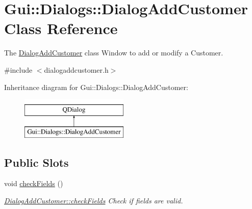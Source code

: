 \hypertarget{classGui_1_1Dialogs_1_1DialogAddCustomer}{\section{Gui\-:\-:Dialogs\-:\-:Dialog\-Add\-Customer Class Reference}
\label{classGui_1_1Dialogs_1_1DialogAddCustomer}
}


The \hyperlink{classGui_1_1Dialogs_1_1DialogAddCustomer}{Dialog\-Add\-Customer} class Window to add or modify a Customer.  




{\ttfamily \#include $<$dialogaddcustomer.\-h$>$}

Inheritance diagram for Gui\-:\-:Dialogs\-:\-:Dialog\-Add\-Customer\-:\begin{figure}[H]
\begin{center}
\leavevmode
\includegraphics[height=2.000000cm]{d2/d50/classGui_1_1Dialogs_1_1DialogAddCustomer}
\end{center}
\end{figure}
\subsection*{Public Slots}
\begin{DoxyCompactItemize}
\item 
\hypertarget{classGui_1_1Dialogs_1_1DialogAddCustomer_ab1c4fdf53139a3aac7243c42881d2af1}{void \hyperlink{classGui_1_1Dialogs_1_1DialogAddCustomer_ab1c4fdf53139a3aac7243c42881d2af1}{check\-Fields} ()}\label{classGui_1_1Dialogs_1_1DialogAddCustomer_ab1c4fdf53139a3aac7243c42881d2af1}

\begin{DoxyCompactList}\small\item\em \hyperlink{classGui_1_1Dialogs_1_1DialogAddCustomer_ab1c4fdf53139a3aac7243c42881d2af1}{Dialog\-Add\-Customer\-::check\-Fields} Check if fields are valid. \end{DoxyCompactList}\end{DoxyCompactItemize}

